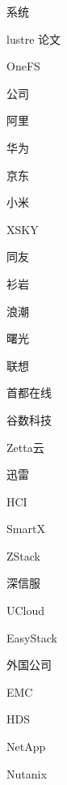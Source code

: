 系统
\begin{enumbox}
\item lustre 论文
\item OneFS
\end{enumbox}

公司
\begin{enumbox}
\item 阿里
\item 华为
\item 京东
\item 小米
\item XSKY
\item 同友
\item 衫岩
\item 浪潮
\item 曙光
\item 联想
\item 首都在线
\item 谷数科技
\item Zetta云
\item 迅雷
\end{enumbox}

HCI
\begin{enumbox}
\item SmartX
\item ZStack
\item 深信服
\item UCloud
\item EasyStack
\end{enumbox}

外国公司
\begin{enumbox}
\item EMC
\item HDS
\item NetApp
\item Nutanix
\end{enumbox}
